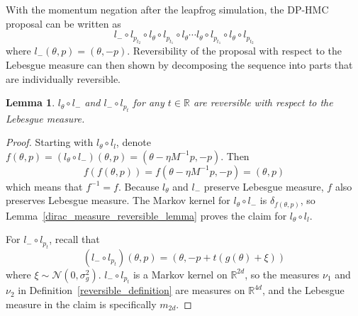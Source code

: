 \documentclass[english,twoside,openright]{HYgraduMLDS}
\newtheorem{lemma}{Lemma}[chapter]
\newcommand{\R}{\mathbb{R}}
\newcommand{\caln}{{\mathcal{N}}}
\begin{document}
With the momentum negation after the leapfrog simulation, the DP-HMC proposal
can be written as
\[
  l_{-}\circ l_{p_{t_{2}}}\circ l_{\theta}\circ l_{p_{t_{1}}}\circ l_{\theta}\dotsb
  l_{\theta}\circ l_{p_{t_{1}}}\circ l_{\theta}\circ l_{p_{t_{2}}}
\]
where \(l_{-}(\theta, p) = (\theta, -p)\). Reversibility of the proposal
with respect to the Lebesgue measure can then shown by
decomposing the sequence into parts that are individually reversible.

\begin{lemma}\label{leapfrog_step_reversible_lemma}
  \(l_{\theta}\circ l_{-}\) and \(l_{-}\circ l_{p_{t}}\) for any \(t\in \R\)
  are reversible with respect to the Lebesgue measure.
\end{lemma}
\begin{proof}
  Starting with \(l_{\theta}\circ l_{l}\), denote
  \(f(\theta, p) = (l_{\theta}\circ l_{-})(\theta, p)
  = (\theta - \eta M^{-1}p, -p)\). Then
  \[
    f(f(\theta, p)) = f(\theta - \eta M^{-1}p, -p) = (\theta, p)
  \]
  which means that \(f^{-1} = f\). Because \(l_{\theta}\) and \(l_{-}\) preserve
  Lebesgue measure, \(f\) also preserves Lebesgue measure.
  The Markov kernel for \(l_{\theta}\circ l_{-}\) is \(\delta_{f(\theta, p)}\),
  so Lemma~\ref{dirac_measure_reversible_lemma} proves the claim for
  \(l_{\theta}\circ l_{l}\).

  For \(l_{-}\circ l_{p_{t}}\), recall that
  \[
    (l_{-}\circ l_{p_{t}})(\theta, p) = (\theta, -p + t(g(\theta) + \xi))
  \]
  where \(\xi \sim \caln(0, \sigma_{g}^{2})\).
  \(l_{-}\circ l_{p_{t}}\) is a Markov kernel on \(\R^{2d}\),
  so the measures \(\nu_{1}\) and \(\nu_{2}\) in
  Definition~\ref{reversible_definition} are measures on \(\R^{4d}\), and
  the Lebesgue measure in the claim is specifically \(m_{2d}\).


\end{proof}
\end{document}
